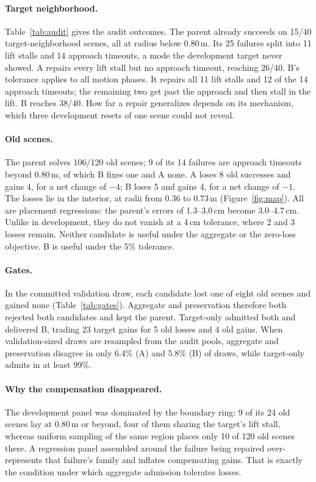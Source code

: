 \documentclass[letterpaper]{article} %
\begin{document}



\paragraph{Target neighborhood.} Table~\ref{tab:audit} gives the audit outcomes. The parent already succeeds on 15/40 target-neighborhood scenes, all at radius below 0.80\,m. Its 25 failures split into 11 lift stalls and 14 approach timeouts, a mode the development target never showed. A repairs every lift stall but no approach timeout, reaching 26/40. B's tolerance applies to all motion phases. It repairs all 11 lift stalls and 12 of the 14 approach timeouts; the remaining two get past the approach and then stall in the lift. B reaches 38/40. How far a repair generalizes depends on its mechanism, which three development resets of one scene could not reveal.

\paragraph{Old scenes.} The parent solves 106/120 old scenes; 9 of its 14 failures are approach timeouts beyond 0.80\,m, of which B fixes one and A none. A loses 8 old successes and gains 4, for a net change of $-4$; B loses 5 and gains 4, for a net change of $-1$. The losses lie in the interior, at radii from 0.36 to 0.73\,m (Figure~\ref{fig:map}). All are placement regressions: the parent's errors of 1.3--3.0\,cm become 3.0--4.7\,cm. Unlike in development, they do not vanish at a 4\,cm tolerance, where 2 and 3 losses remain. Neither candidate is useful under the aggregate or the zero-loss objective. B is useful under the 5\% tolerance.

\paragraph{Gates.} In the committed validation draw, each candidate lost one of eight old scenes and gained none (Table~\ref{tab:gates}). Aggregate and preservation therefore both rejected both candidates and kept the parent. Target-only admitted both and delivered B, trading 23 target gains for 5 old losses and 4 old gains. When validation-sized draws are resampled from the audit pools, aggregate and preservation disagree in only 6.4\% (A) and 5.8\% (B) of draws, while target-only admits in at least 99\%.

\paragraph{Why the compensation disappeared.} The development panel was dominated by the boundary ring: 9 of its 24 old scenes lay at 0.80\,m or beyond, four of them sharing the target's lift stall, whereas uniform sampling of the same region places only 10 of 120 old scenes there. A regression panel assembled around the failure being repaired over-represents that failure's family and inflates compensating gains. That is exactly the condition under which aggregate admission tolerates losses.
\end{document}
